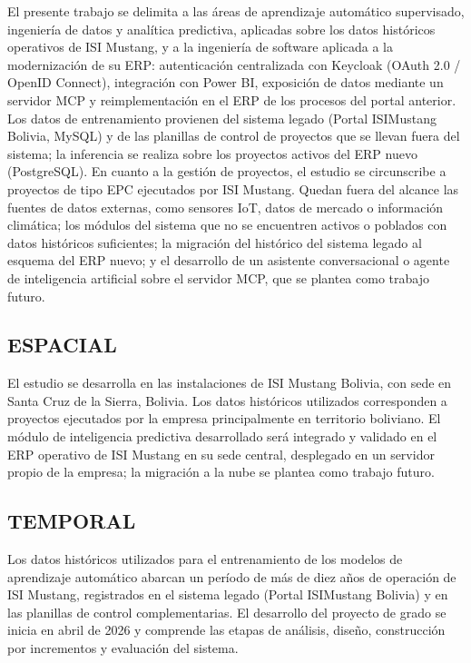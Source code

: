 \documentclass{univalle-perfil}
\begin{document}
El presente trabajo se delimita a las áreas de aprendizaje automático supervisado, ingeniería de datos y analítica predictiva, aplicadas sobre los datos históricos operativos de ISI Mustang, y a la ingeniería de software aplicada a la modernización de su ERP: autenticación centralizada con Keycloak (OAuth 2.0 / OpenID Connect), integración con Power BI, exposición de datos mediante un servidor MCP y reimplementación en el ERP de los procesos del portal anterior. Los datos de entrenamiento provienen del sistema legado (Portal ISIMustang Bolivia, MySQL) y de las planillas de control de proyectos que se llevan fuera del sistema; la inferencia se realiza sobre los proyectos activos del ERP nuevo (PostgreSQL). En cuanto a la gestión de proyectos, el estudio se circunscribe a proyectos de tipo EPC ejecutados por ISI Mustang. Quedan fuera del alcance las fuentes de datos externas, como sensores IoT, datos de mercado o información climática; los módulos del sistema que no se encuentren activos o poblados con datos históricos suficientes; la migración del histórico del sistema legado al esquema del ERP nuevo; y el desarrollo de un asistente conversacional o agente de inteligencia artificial sobre el servidor MCP, que se plantea como trabajo futuro.

\subsection{ESPACIAL}

El estudio se desarrolla en las instalaciones de ISI Mustang Bolivia, con sede en Santa Cruz de la Sierra, Bolivia. Los datos históricos utilizados corresponden a proyectos ejecutados por la empresa principalmente en territorio boliviano. El módulo de inteligencia predictiva desarrollado será integrado y validado en el ERP operativo de ISI Mustang en su sede central, desplegado en un servidor propio de la empresa; la migración a la nube se plantea como trabajo futuro.

\subsection{TEMPORAL}

Los datos históricos utilizados para el entrenamiento de los modelos de aprendizaje automático abarcan un período de más de diez años de operación de ISI Mustang, registrados en el sistema legado (Portal ISIMustang Bolivia) y en las planillas de control complementarias. El desarrollo del proyecto de grado se inicia en abril de 2026 y comprende las etapas de análisis, diseño, construcción por incrementos y evaluación del sistema.
\end{document}
